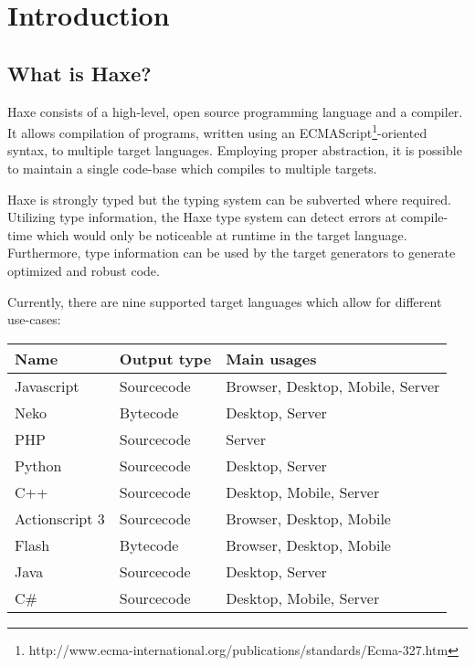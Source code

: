 \chapter{Introduction}
\label{introduction}

\section{What is Haxe?}
\label{introduction-what-is-haxe}


Haxe consists of a high-level, open source programming language and a compiler. It allows compilation of programs, written using an ECMAScript\footnote{http://www.ecma-international.org/publications/standards/Ecma-327.htm}-oriented syntax, to multiple target languages. Employing proper abstraction, it is possible to maintain a single code-base which compiles to multiple targets.

Haxe is strongly typed but the typing system can be subverted where required. Utilizing type information, the Haxe type system can detect errors at compile-time which would only be noticeable at runtime in the target language. Furthermore, type information can be used by the target generators to generate optimized and robust code.

Currently, there are nine supported target languages which allow for different use-cases:

\begin{center}
\begin{tabular}{| l | l | l |}
	\hline
	Name & Output type & Main usages \\ \hline
	Javascript & Sourcecode & Browser, Desktop, Mobile, Server \\
	Neko & Bytecode & Desktop, Server \\
	PHP & Sourcecode & Server \\
	Python & Sourcecode & Desktop, Server \\
	C++ & Sourcecode & Desktop, Mobile, Server \\
	Actionscript 3 & Sourcecode & Browser, Desktop, Mobile \\
	Flash & Bytecode & Browser, Desktop, Mobile \\ 
	Java & Sourcecode & Desktop, Server \\
	C\# & Sourcecode & Desktop, Mobile, Server \\ \hline
\end{tabular}
\end{center}

